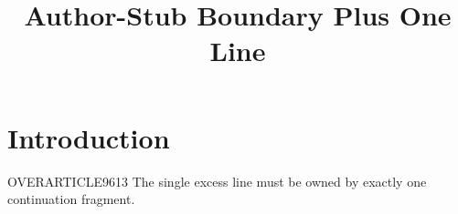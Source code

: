 \documentclass{tnqjournal}
\title{Author-Stub Boundary Plus One Line}
\begin{document}
\maketitle
\section{Introduction}
OVERARTICLE9613 The single excess line must be owned by exactly one continuation fragment.
\end{document}
